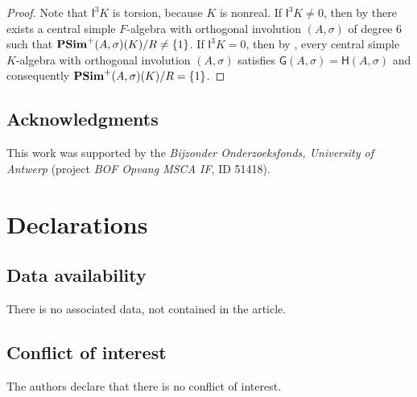 \documentclass[twoside,11pt]{amsart}
\numberwithin{equation}{section}
\theoremstyle{definition}
\newcommand{\s}{\sigma}
\newcommand{\I}{\mathsf{I}}
\newcommand{\G}{\mathsf{G}}
\renewcommand{\H}{\mathsf{H}}
\begin{document}
\begin{proof}
    Note that $\I^3K$ is torsion, because $K$ is nonreal.
    If $\I^3K\neq 0$, then by  there exists a central simple $F$-algebra with orthogonal involution $(A,\s)$ of degree $6$ such that ${\bf PSim}^+(A,\s)(K)/R\neq\{1\}$.   
    If $\I^{3}K=0$, then by \cite[Prop.~3.2]{KP08}, every central simple $K$-algebra with orthogonal involution $(A,\s)$ satisfies $\G(A,\s)=\H(A,\s)$ and consequently ${\bf PSim}^+(A,\s)(K)/R=\{1\}$.    
\end{proof}


\subsection*{Acknowledgments}
This work was supported by the \emph{Bijzonder Onderzoeksfonds, University of Antwerp} (project \emph{BOF Opvang MSCA IF}, ID 51418).

\section*{Declarations}

\subsection*{Data availability}
There is no associated data, not  contained in the article.
\\[-6mm]

\subsection*{Conflict of interest} The authors declare that there is no conflict of interest.




\end{document}
